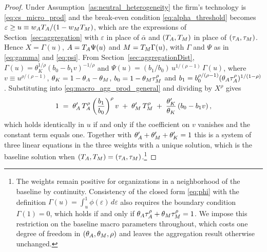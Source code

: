 \begin{proof}
Under Assumption~\ref{as:neutral_heterogeneity} the firm's technology is \eqref{eq:cs_micro_prod} and the break-even condition \eqref{eq:alpha_threshold} becomes $\varepsilon \geq u \equiv w_{A}T_{A}/(1 - w_{M}T_{M})$, which are the expressions of Section~\ref{sec:aggregation} with $\varepsilon$ in place of $\bar{\alpha}$ and $(T_{A}, T_{M})$ in place of $(\tau_{A}, \tau_{M})$.
Hence $X = \Gamma(u)$, $A = T_{A}\Psi(u)$ and $M = T_{M}\Gamma(u)$, with $\Gamma$ and $\Psi$ as in \eqref{eq:gamma} and \eqref{eq:psi}.
From Section~\ref{sec:aggregationDist}, $\Gamma(u) = \theta_{K}^{1/\rho}\left(b_0 - b_1 v\right)^{-1/\rho}$ and $\Psi(u) = (b_1/b_0)\,u^{1/(\rho-1)}\,\Gamma(u)$, where $v \equiv u^{\rho/(\rho-1)}$, $\theta_K = 1-\theta_{A}-\theta_{M}$, $b_0 = 1 - \theta_{M}\tau_{M}^{\rho}$ and $b_1 = b_0^{\rho/(\rho-1)}(\theta_{A}\tau_{A}^{\rho})^{1/(1-\rho)}$.
Substituting into \eqref{eq:macro_agg_prod_general} and dividing by $X^{\rho}$ gives
\[
1 \;=\; \theta'_{A}\,T_{A}^{\rho}\left(\frac{b_1}{b_0}\right)^{\rho} v \;+\; \theta'_{M}\,T_{M}^{\rho} \;+\; \frac{\theta'_{K}}{\theta_{K}}\left(b_0 - b_1 v\right),
\]
which holds identically in $u$ if and only if the coefficient on $v$ vanishes and the constant term equals one.
Together with $\theta'_{A}+\theta'_{M}+\theta'_{K} = 1$ this is a system of three linear equations in the three weights with a unique solution, which is the baseline solution when $(T_{A}, T_{M}) = (\tau_{A}, \tau_{M})$.\footnote{
The weights remain positive for organizations in a neighborhood of the baseline by continuity.
Consistency of the closed form \eqref{eq:phi} with the definition $\Gamma(u) = \int_u^1\phi(\varepsilon)\,d\varepsilon$ also requires the boundary condition $\Gamma(1) = 0$, which holds if and only if $\theta_{A}\tau_{A}^{\rho} + \theta_{M}\tau_{M}^{\rho} = 1$.
We impose this restriction on the baseline macro parameters throughout, which costs one degree of freedom in $(\theta_{A}, \theta_{M}, \rho)$ and leaves the aggregation result otherwise unchanged.
}
\end{proof}

